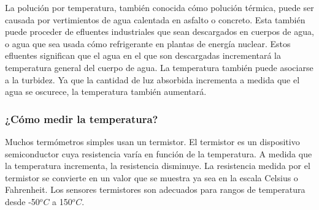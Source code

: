 La poluci\'on por temperatura, tambi\'en conocida c\'omo poluci\'on t\'ermica, puede ser causada por vertimientos de agua calentada en asfalto o concreto. 
Esta tambi\'en puede proceder de efluentes industriales que sean descargados en cuerpos de agua, o agua que sea usada cómo refrigerante en plantas de energ\'ia nuclear. 
Estos efluentes significan que el agua en el que son descargadas incrementar\'a la temperatura general del cuerpo de agua.  
La temperatura también puede asociarse a la turbidez.  
Ya que la cantidad de luz absorbida incrementa a medida que el agua se oscurece, la temperatura también aumentar\'a.

\subsubsection{¿Cómo medir la temperatura?}
Muchos termómetros simples usan un termistor.  
El termistor es un dispositivo semiconductor cuya resistencia varía en función de la temperatura\cite{asale_termistor_nodate}. 
A medida que la temperatura incrementa, la resistencia disminuye.  
La resistencia medida por el termistor se convierte en un valor que se muestra ya sea en la escala Celsius o Fahrenheit.  
Los sensores termistores son adecuados para rangos de temperatura desde -50$^{o}C$ a  150$^{o}C$.

